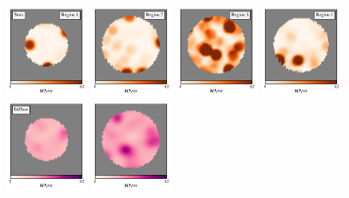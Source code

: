 \documentclass{aa}
\begin{document}
\begin{figure}
  \centering
  \includegraphics[width=0.24\textwidth]{figs/regions/stars_region_0.pdf}
  \includegraphics[width=0.24\textwidth]{figs/regions/stars_region_1.pdf}
    \includegraphics[width=0.24\textwidth]{figs/regions/stars_region_2.pdf}
      \includegraphics[width=0.24\textwidth]{figs/regions/stars_region_3.pdf}\\
        \includegraphics[width=0.24\textwidth]{figs/regions/diffuse_region_0.pdf}
  \includegraphics[width=0.24\textwidth]{figs/regions/diffuse_region_1.pdf}

\end{figure}
\end{document}
